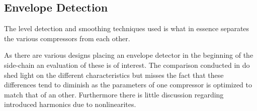 \documentclass[../main2.tex]{subfiles}
\begin{document}
\subsection{Envelope Detection} \label{method_env_det}
The level detection and smoothing techniques used is what in essence separates the various compressors from each other. 

As there are various designs placing an envelope detector in the beginning of the side-chain an evaluation of these is of interest. The comparison conducted in \cite{reiss2012tutorial} do shed light on the different characteristics but misses the fact that these differences tend to diminish as the parameters of one compressor is optimized to match that of an other. Furthermore there is little discussion regarding introduced harmonics due to nonlinearites. 
\end{document}
